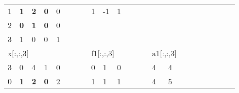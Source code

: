 \begin{table}[h]
\begin{tabular}{lllllllllllllllllllllll}
\multicolumn{1}{|l|}{1} & \multicolumn{1}{l|}{\textbf{1}} & \multicolumn{1}{l|}{\textbf{2}} & \multicolumn{1}{l|}{\textbf{0}} & \multicolumn{1}{l|}{0} &  &  & \multicolumn{1}{l|}{} & \multicolumn{1}{l|}{1}  & \multicolumn{1}{l|}{-1} & \multicolumn{1}{l|}{1}  &  &  &                       &                         &                        &  &  &                       &                        &                         &  &  \\ \cline{1-5} \cline{9-11}
\multicolumn{1}{|l|}{2} & \multicolumn{1}{l|}{\textbf{0}} & \multicolumn{1}{l|}{\textbf{1}} & \multicolumn{1}{l|}{\textbf{0}} & \multicolumn{1}{l|}{0} &  &  &                       &                         &                         &                         &  &  &                       &                         &                        &  &  &                       &                        &                         &  &  \\ \cline{1-5}
\multicolumn{1}{|l|}{3} & \multicolumn{1}{l|}{1}          & \multicolumn{1}{l|}{0}          & \multicolumn{1}{l|}{0}          & \multicolumn{1}{l|}{1} &  &  &                       &                         &                         &                         &  &  &                       &                         &                        &  &  &                       &                        &                         &  &  \\ \cline{1-5}
\multicolumn{5}{l}{x{[}:,:,3{]}}                                                                                                                       &  &  &                       & \multicolumn{3}{l}{f1{[}:,:,3{]}}                                           &  &  &                       & \multicolumn{2}{l}{a1{[}:,:,3{]}}                &  &  &                       &                        &                         &  &  \\ \cline{1-5} \cline{9-11} \cline{15-16}
\multicolumn{1}{|l|}{3} & \multicolumn{1}{l|}{0}          & \multicolumn{1}{l|}{4}          & \multicolumn{1}{l|}{1}          & \multicolumn{1}{l|}{0} &  &  & \multicolumn{1}{l|}{} & \multicolumn{1}{l|}{0}  & \multicolumn{1}{l|}{1}  & \multicolumn{1}{l|}{0}  &  &  & \multicolumn{1}{l|}{} & \multicolumn{1}{l|}{4}  & \multicolumn{1}{l|}{4} &  &  &                       &                        &                         &  &  \\ \cline{1-5} \cline{9-11} \cline{15-16}
\multicolumn{1}{|l|}{0} & \multicolumn{1}{l|}{\textbf{1}} & \multicolumn{1}{l|}{\textbf{2}} & \multicolumn{1}{l|}{\textbf{0}} & \multicolumn{1}{l|}{2} &  &  & \multicolumn{1}{l|}{} & \multicolumn{1}{l|}{1}  & \multicolumn{1}{l|}{1}  & \multicolumn{1}{l|}{1}  &  &  & \multicolumn{1}{l|}{} & \multicolumn{1}{l|}{4}  & \multicolumn{1}{l|}{5} &  &  &                       &                        &                         &  &  \\ \cline{1-5} \cline{9-11} \cline{15-16}

\end{tabular}
\end{table}

